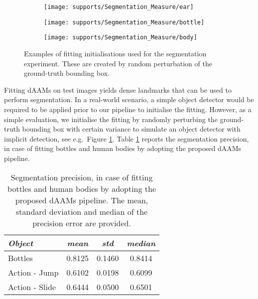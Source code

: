 \begin{figure}[!t]
    \centering
    \begin{subfigure}[b]{0.15\textwidth}
            \texttt{[image: supports/Segmentation\_Measure/ear]}
    \end{subfigure}
    \begin{subfigure}[b]{0.15\textwidth}
            \texttt{[image: supports/Segmentation\_Measure/bottle]}
    \end{subfigure}
    \begin{subfigure}[b]{0.15\textwidth}
            \texttt{[image: supports/Segmentation\_Measure/body]}
    \end{subfigure}
    \caption{Examples of fitting initialisations used for the segmentation experiment. These are created by random perturbation of the ground-truth bounding box.}
    \label{fig:seg_init}
\end{figure}

Fitting dAAMs on test images yields dense landmarks that can be used to perform segmentation. In a real-world scenario, a simple object detector would be required to be applied prior to our pipeline to initialise the fitting. However, as a simple evaluation, we initialise the fitting by randomly perturbing the ground-truth bounding box with certain variance to simulate an object detector with implicit detection, see e.g.~Figure \ref{fig:seg_init}. Table  \ref{tab:seg_result} reports the segmentation precision, in case of fitting bottles and human bodies by adopting the proposed dAAMs pipeline.

\begin{table}[!h]
\small
\centering
\begin{tabular}{|l|c|c|c|}
\hline
\emph{Object}   & \emph{mean} & \emph{std} & \emph{median}\\
\hline\hline
Bottles         & 0.8125      & 0.1460     & 0.8414\\
Action - Jump   & 0.6102      & 0.0198     & 0.6099\\
Action - Slide  & 0.6444      & 0.0500     & 0.6501\\
\hline
\end{tabular}
\caption{Segmentation precision, in case of fitting bottles and human bodies by adopting the proposed dAAMs pipeline. The mean, standard deviation and median of the precision error are provided.}
\label{tab:seg_result}
\end{table}

% 
% 


